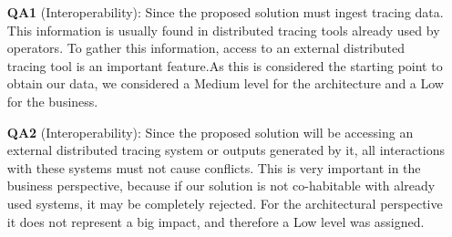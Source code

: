 \begin{itemize}
    \item[\textbf{QA1}] (Interoperability): Since the proposed solution must ingest tracing data. This information is usually found in distributed tracing tools already used by operators. To gather this information, access to an external distributed tracing tool is an important feature.As this is considered the starting point to obtain our data, we considered a Medium level for the architecture and a Low for the business.

    \item[\textbf{QA2}] (Interoperability): Since the proposed solution will be accessing an external distributed tracing system or outputs generated by it, all interactions with these systems must not cause conflicts. This is very important in the business perspective, because if our solution is not co-habitable with already used systems, it may be completely rejected. For the architectural perspective it does not represent a big impact, and therefore a Low level was assigned.




\end{itemize}

